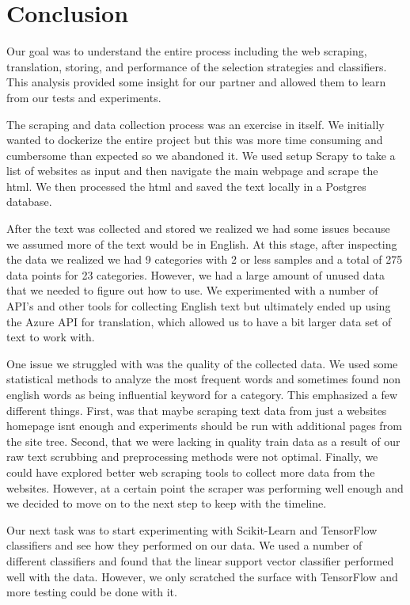 \chapter*{Conclusion}

Our goal was to understand the entire process including the web scraping, translation, storing, and performance of the selection strategies and classifiers. This analysis provided some insight for our partner and allowed them to learn from our tests and experiments. 

The scraping and data collection process was an exercise in itself. We initially wanted to dockerize the entire project but this was more time consuming and cumbersome than expected so we abandoned it. We used setup Scrapy to take a list of websites as input and then navigate the main webpage and scrape the html. We then processed the html and saved the text locally in a Postgres database. 

After the text was collected and stored we realized we had some issues because we assumed more of the text would be in English. At this stage, after inspecting the data we realized we had 9 categories with 2 or less samples and a total of 275 data points for 23 categories. However, we had a large amount of unused data that we needed to figure out how to use. We experimented with a number of API's and other tools for collecting English text but ultimately ended up using the Azure API for translation, which allowed us to have a bit larger data set of text to work with. 

One issue we struggled with was the quality of the collected data. We used some statistical methods to analyze the most frequent words and sometimes found non english words as being influential keyword for a category. This emphasized a few different things. First, was that maybe scraping text data from just a websites homepage isnt enough and experiments should be run with additional pages from the site tree. Second, that we were lacking in quality train data as a result of our raw text scrubbing and preprocessing methods were not optimal. Finally, we could have explored better web scraping tools to collect more data from the websites. However, at a certain point the scraper was performing well enough and we decided to move on to the next step to keep with the timeline.

Our next task was to start experimenting with Scikit-Learn and TensorFlow classifiers and see how they performed on our data. We used a number of different classifiers and found that the linear support vector classifier performed well with the data. However, we only scratched the surface with TensorFlow and more testing could be done with it. 


